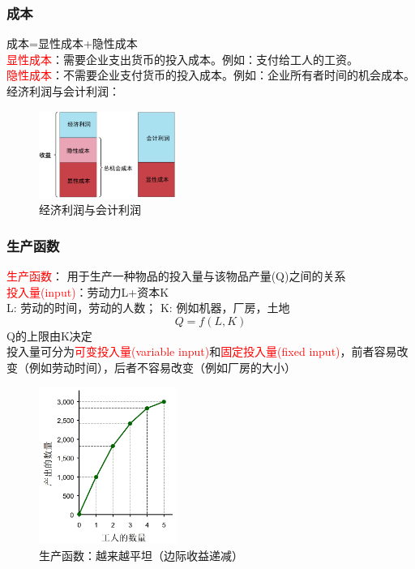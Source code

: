 \documentclass[12pt,a4paper]{article}
\begin{document}
\subsubsection{成本}
成本=显性成本+隐性成本\\
\textcolor{red}{显性成本}：需要企业支出货币的投入成本。例如：支付给工人的工资。\\
\textcolor{red}{隐性成本}：不需要企业支付货币的投入成本。例如：企业所有者时间的机会成本。\\
经济利润与会计利润：\\
\begin{figure}[H] 
  \centering %
  \includegraphics[width=0.4\textwidth]{经济利润与会计利润.png} 
  \caption{经济利润与会计利润} %
\end{figure}
\subsubsection{生产函数}
\textcolor{red}{生产函数}： 用于生产一种物品的投入量与该物品产量(Q)之间的关系\\

\textcolor{red}{投入量(input)}：劳动力L+资本K\\
L: 劳动的时间，劳动的人数； K: 例如机器，厂房，土地
\[
Q=f(L,K)
\]
Q的上限由K决定\\

投入量可分为\textcolor{red}{可变投入量(variable input)}和\textcolor{red}{固定投入量(fixed input)}，前者容易改变（例如劳动时间），后者不容易改变（例如厂房的大小）\\
\begin{figure}[H] 
  \centering %
  \includegraphics[width=0.4\textwidth]{生产函数.png} 
  \caption{生产函数：越来越平坦（边际收益递减）} %
\end{figure}
\end{document}
